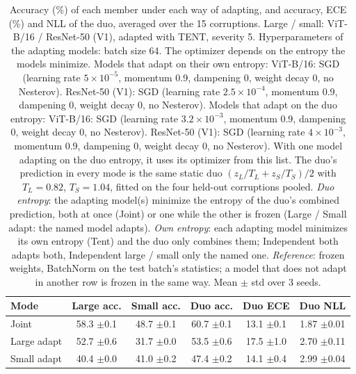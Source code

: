 \begin{table}[t]
    \centering
    \small
    \caption{Accuracy (\%) of each member under each way of adapting, and accuracy, ECE (\%) and NLL of the duo, averaged over the 15 corruptions. Large / small: ViT-B/16 / ResNet-50 (V1), adapted with TENT, severity 5. Hyperparameters of the adapting models: batch size 64. The optimizer depends on the entropy the models minimize. Models that adapt on their own entropy: ViT-B/16: SGD (learning rate $5 \times 10^{-5}$, momentum 0.9, dampening 0, weight decay 0, no Nesterov). ResNet-50 (V1): SGD (learning rate $2.5 \times 10^{-4}$, momentum 0.9, dampening 0, weight decay 0, no Nesterov). Models that adapt on the duo entropy: ViT-B/16: SGD (learning rate $3.2 \times 10^{-3}$, momentum 0.9, dampening 0, weight decay 0, no Nesterov). ResNet-50 (V1): SGD (learning rate $4 \times 10^{-3}$, momentum 0.9, dampening 0, weight decay 0, no Nesterov). With one model adapting on the duo entropy, it uses its optimizer from this list. The duo's prediction in every mode is the same static duo $(z_L / T_L + z_S / T_S) / 2$ with $T_L = 0.82$, $T_S = 1.04$, fitted on the four held-out corruptions pooled. \emph{Duo entropy}: the adapting model(s) minimize the entropy of the duo's combined prediction, both at once (Joint) or one while the other is frozen (Large / Small adapt: the named model adapts). \emph{Own entropy}: each adapting model minimizes its own entropy (Tent) and the duo only combines them; Independent both adapts both, Independent large / small only the named one. \emph{Reference}: frozen weights, BatchNorm on the test batch's statistics; a model that does not adapt in another row is frozen in the same way. Mean $\pm$ std over 3 seeds.}
    \label{tab:adaptation_modes_summary:tent_bn}
    \begin{tabular}{lccccc}
        \toprule
        Mode & Large acc. & Small acc. & Duo acc. & Duo ECE & Duo NLL \\
        \midrule
        Joint & 58.3 {\scriptsize$\pm$0.1} & 48.7 {\scriptsize$\pm$0.1} & 60.7 {\scriptsize$\pm$0.1} & 13.1 {\scriptsize$\pm$0.1} & 1.87 {\scriptsize$\pm$0.01} \\
        Large adapt & 52.7 {\scriptsize$\pm$0.6} & 31.7 {\scriptsize$\pm$0.0} & 53.5 {\scriptsize$\pm$0.6} & 17.5 {\scriptsize$\pm$1.0} & 2.70 {\scriptsize$\pm$0.11} \\
        Small adapt & 40.4 {\scriptsize$\pm$0.0} & 41.0 {\scriptsize$\pm$0.2} & 47.4 {\scriptsize$\pm$0.2} & 14.1 {\scriptsize$\pm$0.4} & 2.99 {\scriptsize$\pm$0.04} \\

\end{tabular}
\end{table}
